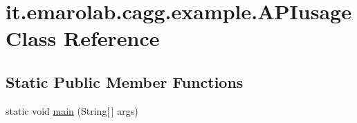 \hypertarget{classit_1_1emarolab_1_1cagg_1_1example_1_1APIusage}{\section{it.\-emarolab.\-cagg.\-example.\-A\-P\-Iusage Class Reference}
\label{classit_1_1emarolab_1_1cagg_1_1example_1_1APIusage}
}
\subsection*{Static Public Member Functions}
\begin{DoxyCompactItemize}
\item 
static void \hyperlink{classit_1_1emarolab_1_1cagg_1_1example_1_1APIusage_af31180520f3ca52e6319f2f0d2525eeb}{main} (String\mbox{[}$\,$\mbox{]} args)
\end{DoxyCompactItemize}
